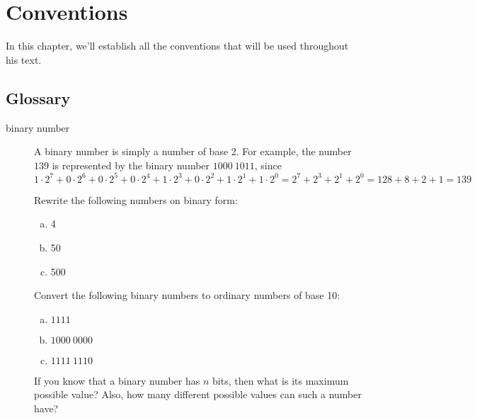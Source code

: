 \begin{comment}
  
\end{comment}

\chapter{Conventions}
\label{cha:pseudocode-convent}

In this chapter, we'll establish all the conventions that will be used
throughout his text.

\section{Glossary}

\begin{description}
\item[binary number] A binary number is simply a number of base 2. For
  example, the number $139$ is represented by the binary number $1000\
  1011$, since $1 \cdot 2^7 + 0 \cdot 2^6 + 0 \cdot 2^5 + 0 \cdot 2^4
  + 1 \cdot 2^3 + 0 \cdot 2^2 + 1 \cdot 2^1 + 1 \cdot 2^0 = 2^7 + 2^3
  + 2^1 + 2^0 = 128 + 8 + 2 + 1 = 139 $

  \begin{Exercise}[label={n-to-bin}]
    Rewrite the following numbers on binary form:

    \begin{enumerate}[(a)]
    \item 4
    \item 50
    \item 500
    \end{enumerate}

  \end{Exercise}

  \begin{Exercise}[label={bin-to-n}]
    Convert the following binary numbers to ordinary numbers of base
    10:

    \begin{enumerate}[(a)]
    \item $1111$
    \item $1000\ 0000$
    \item $1111\ 1110$
    \end{enumerate}

  \end{Exercise}

\begin{Exercise}[label={n-bits-max-val}]
  If you know that a binary number has $n$ bits, then what is its
  maximum possible value? Also, how many different possible values can
  such a number have?
\end{Exercise}


\end{description}
